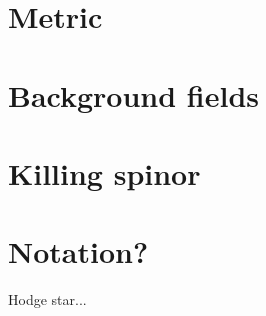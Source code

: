 \appendix
\section{Metric}\label{sec:metric}


\section{Background fields}


\section{Killing spinor}


\section{Notation?}
Hodge star...

